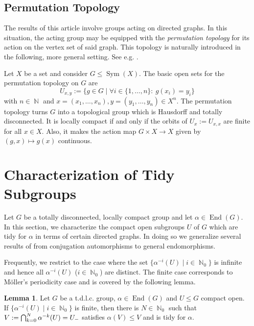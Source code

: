 \documentclass{article}
\DeclareMathOperator\Sym{Sym}
\DeclareMathOperator\End{End}
\DeclareMathOperator\bbN{\mathbb{N}}
\theoremstyle{definition}
\newtheorem{lemma}[theorem]{Lemma}
\begin{document}
\subsection{Permutation Topology}\label{sec:perm_top}
The results of this article involve groups acting on directed graphs. In this situation, the acting group may be equipped with the \emph{permutation topology} for its action on the vertex set of said graph. This topology is naturally introduced in the following, more general setting. See e.g. \cite{Moe10}.

Let $X$ be a set and consider $G\le\Sym(X)$. The basic open sets for the permutation topology on $G$ are
\begin{displaymath}
 U_{x,y}:=\{g\in G\mid \forall i\in\{1,\ldots,n\}:\ g(x_{i})=y_{i}\}
\end{displaymath}
with $n\in\bbN$ and $x=(x_{1},\ldots,x_{n}), y=(y_{1},\ldots,y_{n})\in X^{n}$. The permutation topology turns $G$ into a topological group which is Hausdorff and totally disconnected. It  is locally compact if and only if the orbits of $U_{x}:= U_{x,x}$ are finite for all $x\in X$. Also, it makes the action map $G\times X\!\to\! X$ given by $(g,x)\!\mapsto\! g(x)$ continuous.

\section{Characterization of Tidy Subgroups}\label{sec:char_tidy_subgroups}

Let $G$ be a totally disconnected, locally compact group and let $\alpha\in\End(G)$. In this section, we characterize the compact open subgroups $U$ of $G$ which are tidy for $\alpha$ in terms of certain directed graphs. In doing so we generalize several results of \cite{Moe02} from conjugation automorphisms to general endomorphisms.

Frequently, we restrict to the case where the set $\{\alpha^{-i}(U)\mid i\in\bbN_{0}\}$ is infinite and hence all $\alpha^{-i}(U)$ ($i\in\bbN_{0}$) are distinct. The finite case corresponds to M{\"o}ller's periodicity case \cite[Lemma 3.1]{Moe02} and is covered by the following lemma.

\begin{lemma}\label{lem:finite_vertices_case}
Let $G$ be a t.d.l.c. group, $\alpha\in\End(G)$ and $U\le G$ compact open. If $\{\alpha^{-i}(U)\mid i\in\bbN_{0}\}$ is finite, then there is $N\in\bbN_{0}$ such that $\smash{V:=\bigcap_{k=0}^{N}\alpha^{-k}(U)}=U_{-}$ satisfies $\alpha(V)\le V$ and is tidy for $\alpha$.
\end{lemma}
\end{document}
